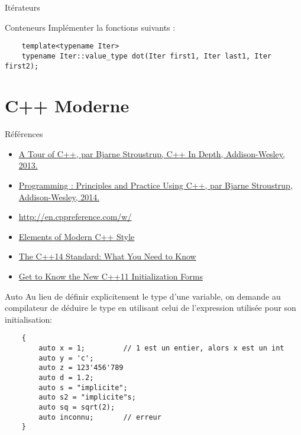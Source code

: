 \documentclass[handout]{beamer}
\let\emph\relax %
\begin{document}
\begin{frame}[fragile]{Itérateurs}
    
\end{frame}

\begin{frame}[fragile]{Conteneurs}
    \emph{Exercice --} Implémenter la fonctions suivants :
    \begin{lstlisting}
    template<typename Iter>
    typename Iter::value_type dot(Iter first1, Iter last1, Iter first2); 
    \end{lstlisting}
\end{frame}


\section{C++ Moderne}

\begin{frame}[t]{Références}
    \begin{itemize}
        \item \href{http://www.informit.com/store/tour-of-c-plus-plus-9780133549010}{A Tour of C++, par Bjarne Stroustrup, C++ In Depth, Addison-Wesley, 2013.}
        \item \href{http://www.stroustrup.com/Programming/}{Programming : Principles and Practice Using C++, par Bjarne Stroustrup, Addison-Wesley, 2014.}
        \item \url{http://en.cppreference.com/w/}
        \item \href{https://herbsutter.com/elements-of-modern-c-style/}{Elements of Modern C++ Style}
        \item \href{http://www.drdobbs.com/cpp/the-c14-standard-what-you-need-to-know/240169034}{The C++14 Standard: What You Need to Know}
        \item \href{http://www.informit.com/articles/article.aspx?p=1852519}{Get to Know the New C++11 Initialization Forms}
    \end{itemize}
\end{frame}

\begin{frame}[fragile]{Auto}
    Au lieu de définir explicitement le type d'une variable, on demande au compilateur de déduire le
    type en utilisant celui de l'expression utilisée pour son initialisation:
    \begin{lstlisting}
    {
        auto x = 1;         // 1 est un entier, alors x est un int
        auto y = 'c';
        auto z = 123'456'789
        auto d = 1.2;
        auto s = "implicite";
        auto s2 = "implicite"s;
        auto sq = sqrt(2);
        auto inconnu;       // erreur
    }
    \end{lstlisting}
\end{frame}
\end{document}
